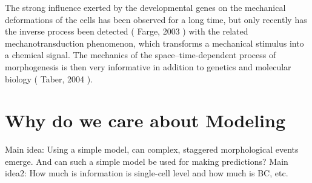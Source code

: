 The strong influence exerted by the developmental genes on the mechanical deformations of the cells has been observed for a long time, but only recently has the inverse process been detected (
Farge, 2003
) with the related mechanotransduction phenomenon, which transforms a mechanical stimulus into a chemical signal. The mechanics of the space–time-dependent process of morphogenesis is then very informative in addition to genetics and molecular biology (
Taber, 2004
). 
\section{Why do we care about Modeling}
Main idea: Using a simple model, can complex, staggered morphological events emerge. And can such a simple model be used for making predictions?
Main idea2: How much is information is single-cell level and how much is BC, etc.